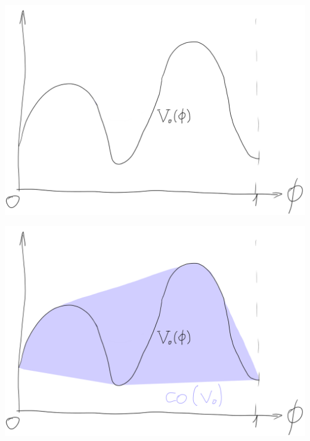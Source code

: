 \documentclass[english,10pt
,aspectratio=169
]{beamer}
\begin{document}
%	


\begin{frame}
	\centering
	\includegraphics[scale=0.3]{pics/M7/concav1.png}
\end{frame}


\begin{frame}
	\centering
	\includegraphics[scale=0.3]{pics/M7/concav2.png}
\end{frame}
\end{document}
